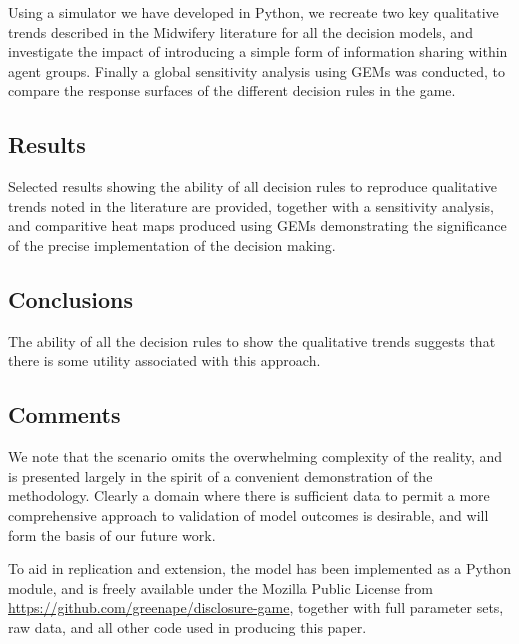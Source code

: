 Using a simulator we have developed in Python, we recreate two key qualitative trends described in the Midwifery literature for all the decision models, and investigate the impact of introducing a simple form of information sharing within agent groups.
Finally a global sensitivity analysis using \acp{GEM} was conducted, to compare the response surfaces of the different decision rules in the game.

\subsection*{Results} 

Selected results showing the ability of all decision rules to reproduce qualitative trends noted in the literature are provided, together with a sensitivity analysis, and comparitive heat maps produced using \acp{GEM} demonstrating the significance of the precise implementation of the decision making.

\subsection*{Conclusions}


The ability of all the decision rules to show the qualitative trends suggests that there is some utility associated with this approach.  

\subsection*{Comments} 


We note that the scenario omits the overwhelming complexity of the reality, and is presented largely in the spirit of a convenient demonstration of the methodology. Clearly a domain where there is sufficient data to permit a more comprehensive approach to validation of model outcomes is desirable, and will form the basis of our future work.

To aid in replication and extension, the model has been implemented as a Python module, and is freely available under the Mozilla Public License from \url{https://github.com/greenape/disclosure-game}, together with full parameter sets, raw data, and all other code used in producing this paper.